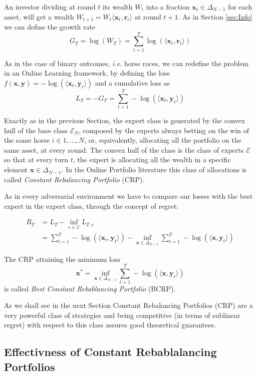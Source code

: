 An investor dividing at round $t$ its wealth $W_t$ into a fraction $\mathbf x_t\in\Delta_{N-1}$ for each asset, will get a wealth $W_{t+1}=W_t\langle \mathbf x_t,\mathbf r_t\rangle$ at round $t+1$. As in Section \ref{sec:Info} we can define the growth rate 
$$G_T=\log(W_T)=\sum\limits_{t=1}^T\log(\langle\mathbf x_t, \mathbf r_t\rangle)$$

As in the case of binary outcomes, \emph{i.e.} horse races, we can redefine the problem in an Online Learning framework, by defining the loss $f(\mathbf x,\mathbf y)=-\log(\langle\mathbf x_t, \mathbf y_t\rangle)$ and a cumulative loss as 
$$L_T=-G_T=\sum\limits_{t=1}^T-\log(\langle\mathbf x_t,\mathbf y_t\rangle)$$

Exactly as in the previous Section, the expert class is generated by the convex hull of the base class $\mathcal E_N$, composed by the experts always betting on the win of the same horse $i\in1,\ldots,N$, or, equivalently, allocating all the portfolio on the same asset, at every round. The convex hull of the class is the class of experts $\mathcal E$ so that at every turn $t$, the expert is allocating all the wealth in a specific element $\mathbf x\in\Delta_{N-1}$. In the Online Portfolio literature this class of allocations is called \emph{Constant Rebalancing Portfolio} (CRP).  

As in every adversarial environment we have to compare our losses with the best expert in the expert class, through the concept of regret:

\begin{align}
R_T&=L_T-\inf\limits_{e\in \mathcal E}L_{T,e}\\
&=\sum\limits_{t=1}^T-\log(\langle\mathbf x_t,\mathbf y_t\rangle)-\inf\limits_{\mathbf x\in\Delta_{N-1}}\sum\limits_{t=1}^T-\log(\langle\mathbf x,\mathbf y_t\rangle)
\end{align}

The CRP attaining the minimum loss 
$$\mathbf x^*=\inf\limits_{\mathbf x \in \Delta_{N-1}}\sum\limits_{t=1}^T-\log(\langle\mathbf x,\mathbf y_t\rangle)$$
is called \emph{Best Constant Rebablancing Portfolio} (BCRP).

As we shall see in the next Section Constant Rebalancing Portfolios (CRP) are a very powerful class of strategies and being competitive (in terms of sublinear regret) with respect to this class assures good theoretical guarantees. 

\subsection{Effectivness of Constant Rebablalancing Portfolios}

